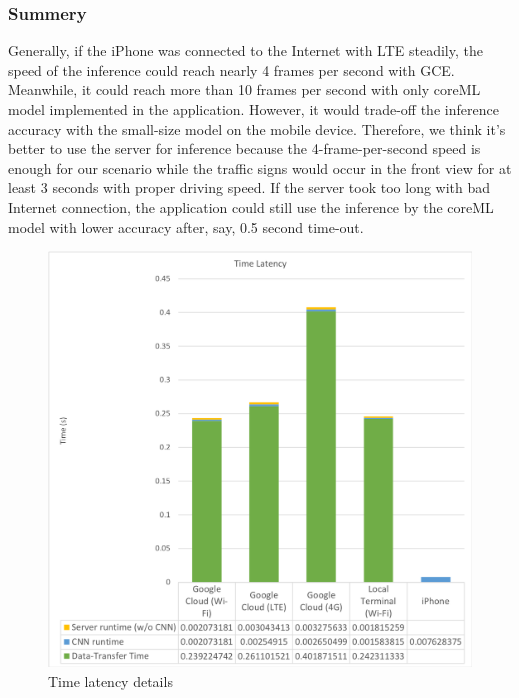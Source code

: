 \documentclass[conference]{IEEEtran}
\begin{document}
\subsubsection{Summery}
Generally, if the iPhone was connected to the Internet with LTE steadily, the speed of the inference could reach nearly 4 frames per second with GCE. Meanwhile, it could reach more than 10 frames per second with only coreML model implemented in the application. However, it would trade-off the inference accuracy with the small-size model on the mobile device. Therefore, we think it's better to use the server for inference because the 4-frame-per-second speed is enough for our scenario while the traffic signs would occur in the front view for at least 3 seconds with proper driving speed. If the server took too long with bad Internet connection, the application could still use the inference by the coreML model with lower accuracy after, say, 0.5 second time-out. 
\begin{figure}[t]
\centering
  \begin{minipage}{.5\textwidth}
    \centering
    \includegraphics[width=1.0\linewidth]{latency_chart.png}
    \caption{Time latency details}
    \label{fig:fig_1}
  \end{minipage}
\end{figure}
\end{document}
